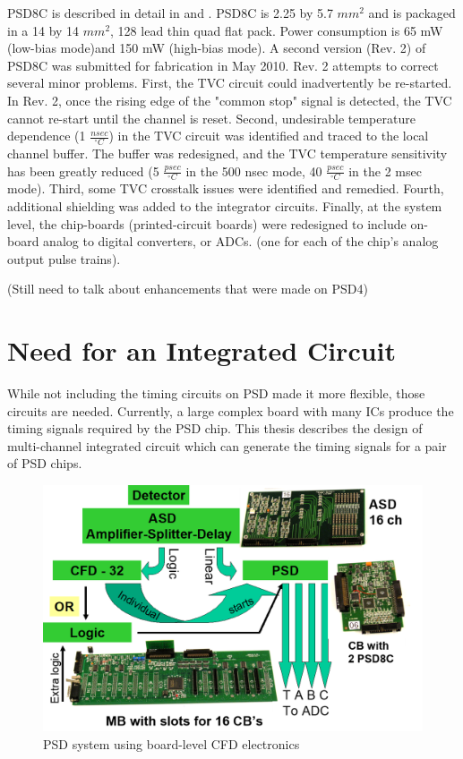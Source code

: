 \documentclass[12pt,oneside,final]{siuethesis}
\theoremstyle{definition}
\begin{document}
PSD8C is described in detail in \cite{PROCTOR} and \cite{HALL}. PSD8C is 2.25 by 5.7 $mm^2$ and is packaged in a 14 by 14 $mm^2$, 128 lead thin quad flat pack. Power consumption is 65 mW (low-bias mode)and 150 mW (high-bias mode).
A second version (Rev. 2) of PSD8C was submitted for fabrication in May 2010. Rev. 2 attempts to correct several minor
problems. First, the TVC circuit could inadvertently be re-started. In Rev. 2, once the rising edge of the "common stop" signal is detected, the TVC cannot re-start until the channel is reset. Second, undesirable temperature dependence (1 $\frac{nsec}{^{\circ}C}$) in the TVC circuit was identified and traced to the local channel buffer. The buffer was redesigned, and the TVC temperature sensitivity has been greatly reduced (5 $\frac{psec}{^{\circ}C}$ in the 500 nsec mode, 40 $\frac{psec}{^{\circ}C}$ in the 2 msec mode). Third, some TVC crosstalk issues were identified and remedied. Fourth, additional shielding was added to the integrator circuits. Finally, at the system level, the chip-boards (printed-circuit boards) were redesigned to include on-board analog to digital converters, or ADCs. (one for each of the chip's analog output pulse trains).

(Still need to talk about enhancements that were made on PSD4)


\section{Need for an Integrated Circuit}

While not including the timing circuits on PSD made it more flexible, those circuits are needed.  Currently, a large complex board with many ICs produce the timing signals required by the PSD chip. This thesis describes the design of multi-channel integrated circuit which can generate the timing signals for a pair of PSD chips.

\begin{figure}[htbp!]
	\centering
 	\includegraphics[scale=0.8,keepaspectratio=true]{./ch1_figures/PSD_system.png}
 	\caption{PSD system using board-level CFD electronics}
 	\label{FIG:PSD_SYSTEM}
\end{figure}
\end{document}
